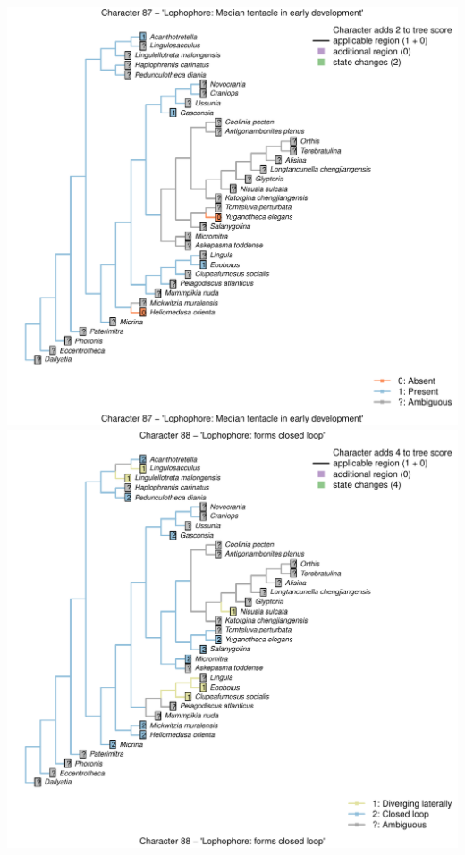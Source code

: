 \documentclass[]{book}
\theoremstyle{definition}
\theoremstyle{definition}
\theoremstyle{definition}
\theoremstyle{remark}
\begin{document}
\includegraphics{Brachiopod_phylogeny_files/figure-latex/unnamed-chunk-4-87.pdf}
\includegraphics{Brachiopod_phylogeny_files/figure-latex/unnamed-chunk-4-88.pdf}
\end{document}
